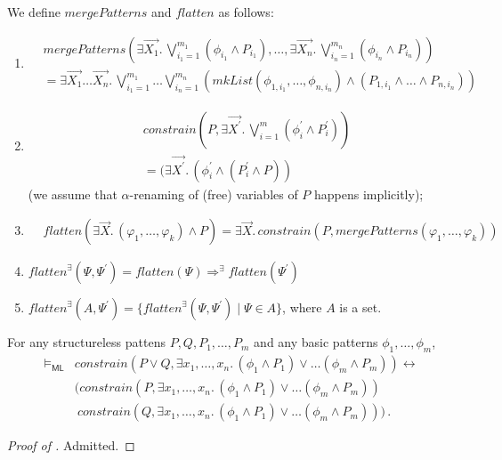 \documentclass{article}
\newcommand{\ML}{\mathsf{ML}}
\begin{document}
\begin{definition}
We define $\mathit{mergePatterns}$ and $\mathit{flatten}$ as follows:
\begin{enumerate}
    \item
    \begin{align*}
     & \mathit{mergePatterns}(\exists \vec{X_1}.\, \bigvee_{i_{1}=1}^{m_1} (\phi_{i_1} \land P_{i_1}),
     \ldots, \exists \vec{X_n}.\, \bigvee_{i_{n}=1}^{m_n} (\phi_{i_n} \land P_{i_n}))
     \\ & = \exists \vec{X_1}\ldots\vec{X_n}.\, \bigvee_{i_{1}=1}^{m_1} \ldots \bigvee_{i_{n}=1}^{m_n}
       (\mathit{mkList}(\phi_{1, i_1}, \ldots, \phi_{n, i_n}) \land (P_{1, i_1} \land \ldots \land P_{n, i_n}))
    \end{align*}
    \item
        \begin{align*}
            & \mathit{constrain}(P, \exists \vec{X^\prime} .\,
            \bigvee_{i=1}^{m} (\phi^\prime_i \land P^\prime_i))
            \\& = (\exists \vec{X^\prime}.\, (\phi^\prime_i \land (P^\prime_i \land P))
    \end{align*}
    (we assume that $\alpha$-renaming of (free) variables of $P$ happens implicitly);
    \item
        \begin{align*}
            & \mathit{flatten}(\exists \vec{X}.\, (\varphi_1, \ldots, \varphi_k) \land P)
            = \exists \vec{X}.\, \mathit{constrain}(P, \mathit{mergePatterns}(\varphi_1, \ldots, \varphi_k))
    \end{align*}
    \item $\mathit{flatten}^\exists(\Psi, \Psi^\prime) = \mathit{flatten}(\Psi) \Rightarrow^\exists \mathit{flatten}(\Psi^\prime)$
    \item $\mathit{flatten}^\exists(A, \Psi^\prime) = \{ \mathit{flatten}^\exists(\Psi, \Psi^\prime) \mid \Psi \in A \}$, where $A$ is a set.
\end{enumerate}
\end{definition}

\begin{lemma}\label{lem:constrain}
  For any structureless pattens $P, Q, P_1, \ldots, P_m$
  and any basic patterns $\phi_1, \ldots, \phi_m$,
    \begin{align*}
        \vDash_\ML & \mathit{constrain}(P \lor Q, \exists x_1,\ldots,x_{n}.\, (\phi_1 \land P_1) \lor \ldots (\phi_m \land P_{m})) \leftrightarrow
        \\ & ( \mathit{constrain}(P, \exists x_1,\ldots,x_{n}.\, (\phi_1 \land P_1) \lor \ldots (\phi_m \land P_{m}))
        \\ & \ \mathit{constrain}(Q, \exists x_1,\ldots,x_{n}.\, (\phi_1 \land P_1) \lor \ldots (\phi_m \land P_{m})) ) \, .
    \end{align*}
\end{lemma}
\begin{proof}[Proof of ]
Admitted.
\end{proof}
\end{document}
